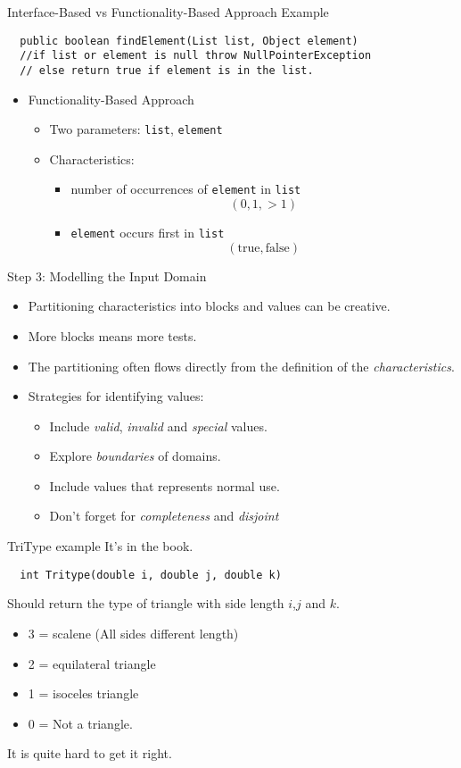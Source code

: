 \documentclass{beamer}
\begin{document}
\begin{frame}[fragile]
{Interface-Based vs Functionality-Based Approach Example}
\begin{verbatim}
  public boolean findElement(List list, Object element)
  //if list or element is null throw NullPointerException
  // else return true if element is in the list.
\end{verbatim}
\begin{itemize}
  \item Functionality-Based Approach
   \begin{itemize}
     \item Two parameters: {\tt list}, {\tt element}
     \item Characteristics:
      \begin{itemize}
        \item number of occurrences of {\tt element} in {\tt list}
          \[ (0,1,>1)\]
        \item {\tt element} occurs first in {\tt list}
        \[ (\mathrm{true},\mathrm{false}) \]
      \end{itemize}
    \end{itemize}
%
\end{itemize}
%
\end{frame}
\begin{frame}{Step 3: Modelling the Input Domain}
  \begin{itemize}
  \item Partitioning characteristics into blocks and values can be
    creative.
  \item More blocks means more tests.
  \item The partitioning often flows directly from the definition of
    the {\em characteristics}.
  \item Strategies for identifying values:
    \begin{itemize}
    \item Include {\em valid}, {\em invalid} and {\em special} values.
    \item Explore {\em boundaries} of domains.
    \item Include values that represents normal use.
    \item Don't forget for {\em completeness} and {\em disjoint}
    \end{itemize}
  \end{itemize}  
\end{frame}
\begin{frame}[fragile]{TriType example}
It's in the book.
  \begin{lstlisting}
  int Tritype(double i, double j, double k)
  \end{lstlisting}
Should return  the type of triangle with side length $i$,$j$ and $k$.
  \begin{itemize}
  \item 3 = scalene (All sides different length)
  \item 2 = equilateral triangle
  \item 1 = isoceles triangle 
  \item 0 = Not a triangle.
  \end{itemize}
It is quite hard to get it right.
\end{frame}
\end{document}
